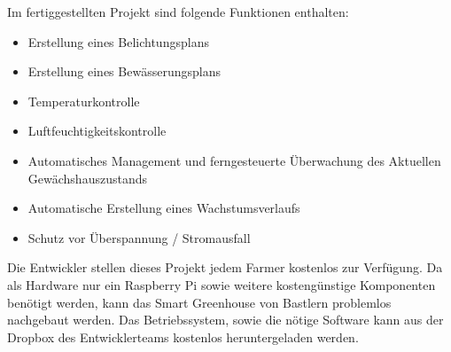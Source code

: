 Im fertiggestellten Projekt sind folgende Funktionen enthalten:\\

\begin{itemize} 
	\item Erstellung eines Belichtungsplans
	\item Erstellung eines Bewässerungsplans
	\item Temperaturkontrolle
	\item Luftfeuchtigkeitskontrolle
	\item Automatisches Management und ferngesteuerte Überwachung des Aktuellen Gewächshauszustands
	\item Automatische Erstellung eines Wachstumsverlaufs
	\item Schutz vor Überspannung / Stromausfall
\end{itemize}

Die Entwickler stellen dieses Projekt jedem Farmer kostenlos zur Verfügung. Da als Hardware nur ein Raspberry Pi sowie weitere kostengünstige Komponenten benötigt werden, kann das Smart Greenhouse von Bastlern problemlos nachgebaut werden.
Das Betriebssystem, sowie die nötige Software kann aus der Dropbox des Entwicklerteams kostenlos heruntergeladen werden.
